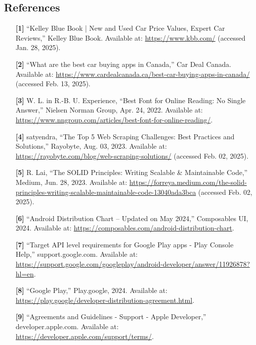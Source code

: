 \documentclass[]{article}
\begin{document}
\subsection{References}
\label{sub:references}
\begin{enumerate}
    \item [\textbf{[1]}] “Kelley Blue Book | New and Used Car Price Values, Expert Car Reviews,” Kelley Blue Book. Available at: \url{https://www.kbb.com/} (accessed Jan. 28, 2025).

    \item [\textbf{[2]}] “What are the best car buying apps in Canada,” Car Deal Canada. Available at: \url{https://www.cardealcanada.ca/best-car-buying-apps-in-canada/} (accessed Feb. 13, 2025).

    \item [\textbf{[3]}] W. L. in R.-B. U. Experience, “Best Font for Online Reading: No Single Answer,” Nielsen Norman Group, Apr. 24, 2022. Available at: \url{https://www.nngroup.com/articles/best-font-for-online-reading/}.
    
    \item [\textbf{[4]}] satyendra, “The Top 5 Web Scraping Challenges: Best Practices and Solutions,” Rayobyte, Aug. 03, 2023. Available at: \url{https://rayobyte.com/blog/web-scraping-solutions/} (accessed Feb. 02, 2025).
    
    \item [\textbf{[5]}] R. Lai, “The SOLID Principles: Writing Scalable \& Maintainable Code,” Medium, Jun. 28, 2023. Available at: \url{https://forreya.medium.com/the-solid-principles-writing-scalable-maintainable-code-13040ada3bca} (accessed Feb. 02, 2025).

    \item [\textbf{[6]}] “Android Distribution Chart – Updated on May 2024,” Composables UI, 2024. Available at: \url{https://composables.com/android-distribution-chart}.

    \item [\textbf{[7]}] “Target API level requirements for Google Play apps - Play Console Help,” support.google.com. Available at: \url{https://support.google.com/googleplay/android-developer/answer/11926878?hl=en}.
    
    \item [\textbf{[8]}] “Google Play,” Play.google, 2024. Available at: \url{https://play.google/developer-distribution-agreement.html}.
    
    \item [\textbf{[9]}] “Agreements and Guidelines - Support - Apple Developer,” developer.apple.com. Available at: \url{https://developer.apple.com/support/terms/}.
    

\end{enumerate}
\end{document}
